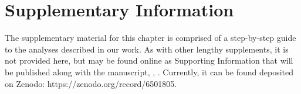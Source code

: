 { \begin{center}  \end{center} }


\begingroup

\let\clearpage\relax
\let\cleardoublepage\relax
\let\cleardoublepage\relax

{\chapter*{Supplementary Information}}

The supplementary material for this chapter is comprised of a step-by-step guide to the analyses described in our work.
As with other lengthy supplements, it is not provided here, but may be found online as Supporting Information that will be published along with the manuscript, \textcite{ramesh2022}, .
Currently, it can be found deposited on Zenodo: https://zenodo.org/record/6501805.

{ \begin{center}  \end{center} }

\endgroup
